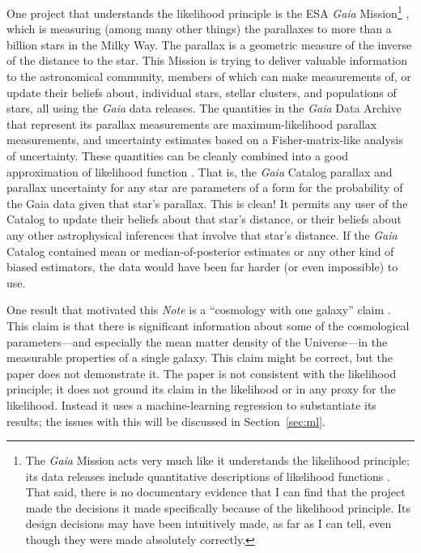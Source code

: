 \documentclass{article}
\newcommand{\documentname}{\textsl{Note}}
\newcommand{\sectionname}{Section}
\newcommand{\secref}[1]{\sectionname~\ref{#1}}
\begin{document}
One project that understands the likelihood principle is the ESA \textsl{Gaia} Mission\footnote{%
The \textsl{Gaia} Mission acts very much like it understands the likelihood principle; its data releases include quantitative descriptions of likelihood functions \cite{gaialf}.
That said, there is no documentary evidence that I can find that the project made the decisions it made specifically because of the likelihood principle.
Its design decisions may have been intuitively made, as far as I can tell, even though they were made absolutely correctly.}
\cite{gaia},
which is measuring (among many other things) the parallaxes to more than a billion stars in the Milky Way.
The parallax is a geometric measure of the inverse of the distance to the star.
This Mission is trying to deliver valuable information to the astronomical community, members of which can make measurements of, or update their beliefs about, individual stars, stellar clusters, and populations of stars, all using the \textsl{Gaia} data releases.
The quantities in the \textsl{Gaia} Data Archive \cite{gaiadata} that represent its parallax measurements are maximum-likelihood parallax measurements, and uncertainty estimates based on a Fisher-matrix-like analysis of uncertainty.
These quantities can be cleanly combined into a good approximation of likelihood function \cite{gaialf}.
That is, the \textsl{Gaia} Catalog parallax and parallax uncertainty for any star are parameters of a form for the probability of the Gaia data given that star's parallax.
This is clean!
It permits any user of the Catalog to update their beliefs about that star's distance, or their beliefs about any other astrophysical inferences that involve that star's distance.
If the \textsl{Gaia} Catalog contained mean or median-of-posterior estimates or any other kind of biased estimators, the data would have been far harder (or even impossible) to use.

One result that motivated this \documentname{} is a ``cosmology with one galaxy'' claim \cite{onegalaxy}.
This claim is that there is significant information about some of the cosmological parameters---and especially the mean matter density of the Universe---in the measurable properties of a single galaxy.
This claim might be correct, but the paper does not demonstrate it.
The paper is not consistent with the likelihood principle; it does not ground its claim in the likelihood or in any proxy for the likelihood.
Instead it uses a machine-learning regression to substantiate its results; the issues with this will be discussed in \secref{sec:ml}.
\end{document}
